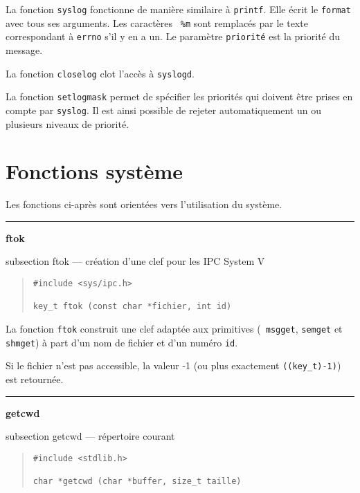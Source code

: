 \documentclass [twoside] {report}
\newcommand {\primitive} [1]
    {
	\phantomsection
	{\large \bf #1}
	\addcontentsline {toc} {subsection} {#1}
    }
\newcommand {\separation}
    {
	\vspace {5mm}
	\nopagebreak
	\hrule
    }
\begin{document}
La fonction {\tt syslog} fonctionne de manière similaire à {\tt printf}.
Elle écrit le {\tt format} avec tous ses arguments. Les caractères {\tt
\%m} sont remplacés par le texte correspondant à {\tt errno} s'il y en a
un.  Le paramètre {\tt priorité} est la priorité du message.

La fonction {\tt closelog} clot l'accès à {\tt syslogd}.

La fonction {\tt setlogmask} permet de spécifier les priorités qui
doivent être prises en compte par {\tt syslog}. Il est ainsi possible de
rejeter automatiquement un ou plusieurs niveaux de priorité.




\section {Fonctions système}



Les fonctions ci-après sont orientées vers l'utilisation du
système.



\separation 
\primitive {ftok} --- création d'une clef pour les IPC System V

\begin {quote}
\begin {verbatim}
#include <sys/ipc.h>

key_t ftok (const char *fichier, int id)
\end{verbatim}
\end {quote}

La fonction {\tt ftok} construit une clef adaptée aux primitives ({\tt
msgget}, {\tt semget} et {\tt shmget}) à part d'un nom de fichier et d'un
numéro {\tt id}.

Si le fichier n'est pas accessible, la valeur -1 (ou plus exactement
\verb|((key_t)-1)|) est retournée.


\separation 
\primitive {getcwd} --- répertoire courant

\begin {quote}
\begin {verbatim}
#include <stdlib.h>

char *getcwd (char *buffer, size_t taille)
\end{verbatim}
\end {quote}
\end{document}
